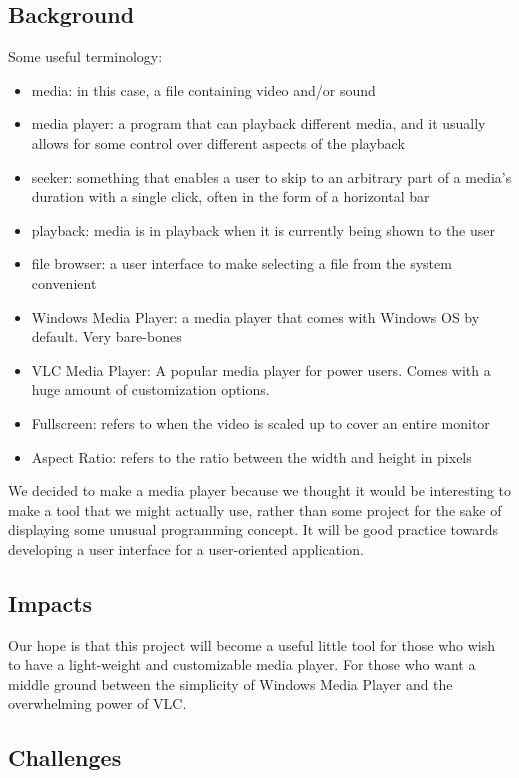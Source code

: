 \documentclass[10pt,conference,onecolumn,compsoc]{IEEEtran}
\begin{document}
\subsection{Background}

Some useful terminology: 
\begin{itemize}
\item media: in this case, a file containing video and/or sound
\item media player: a program that can playback different media, and it usually allows for some control over different aspects of the playback
\item seeker: something that enables a user to skip to an arbitrary part of a media's duration with a single click, often in the form of a horizontal bar  
\item playback: media is in playback when it is currently being shown to the user  
\item file browser: a user interface to make selecting a file from the system convenient  
\item Windows Media Player: a media player that comes with Windows OS by default. Very bare-bones  
\item VLC Media Player: A popular media player for power users. Comes with a huge amount of customization options.
\item Fullscreen: refers to when the video is scaled up to cover an entire monitor  
\item Aspect Ratio: refers to the ratio between the width and height in pixels
\end{itemize}

We decided to make a media player because we thought it would be interesting to make a tool that we might actually use, rather than some project for the sake of displaying some unusual programming concept. It will be good practice towards developing a user interface for a user-oriented application. 

\subsection{Impacts}

Our hope is that this project will become a useful little tool for those who wish to have a light-weight and customizable media player. For those who want a middle ground between the simplicity of Windows Media Player and the overwhelming power of VLC.

\subsection{Challenges}
\end{document}
